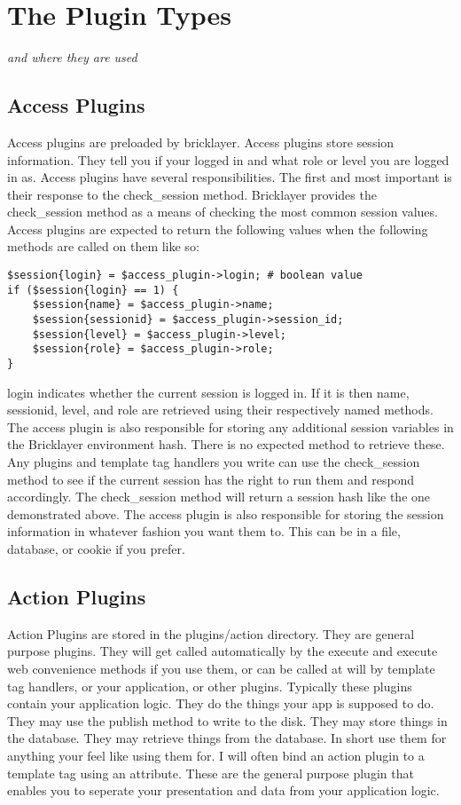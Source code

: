 \section{The Plugin Types}
\textit{and where they are used}
\\
\subsection{Access Plugins}
Access plugins are preloaded by bricklayer. Access plugins store session information. They tell you if your logged in and what role or level you are logged in as. Access plugins have several responsibilities. The first and most important is their response to the check\_session method. Bricklayer provides the check\_session method as a means of checking the most common session values. Access plugins are expected to return the following values when the following methods are called on them like so:
\begin{verbatim}
$session{login} = $access_plugin->login; # boolean value
if ($session{login} == 1) {
	$session{name} = $access_plugin->name;
	$session{sessionid} = $access_plugin->session_id;
	$session{level} = $access_plugin->level;
	$session{role} = $access_plugin->role;
}	
\end{verbatim}
login indicates whether the current session is logged in. If it is then name, sessionid, level, and role are retrieved using their respectively named methods. The access plugin is also responsible for storing any additional session variables in the Bricklayer environment hash. There is no expected method to retrieve these. Any plugins and template tag handlers you write can use the check\_session method to see if the current session has the right to run them and respond accordingly. The check\_session method will return a session hash like the one demonstrated above. The access plugin is also responsible for storing the session information in whatever fashion you want them to. This can be in a file, database, or cookie if you prefer.
\subsection{Action Plugins}
Action Plugins are stored in the plugins/action directory. They are general purpose plugins. They will get called automatically by the execute and execute web convenience methods if you use them, or can be called at will by template tag handlers, or your application, or other plugins. Typically these plugins contain your application logic. They do the things your app is supposed to do. They may use the publish method to write to the disk. They may store things in the database. They may retrieve things from the database. In short use them for anything your feel like using them for. I will often bind an action plugin to a template tag using an attribute. These are the general purpose plugin that enables you to seperate your presentation and data from your application logic.
